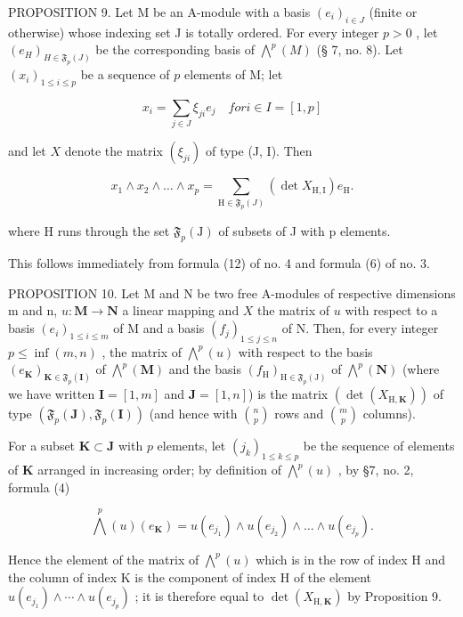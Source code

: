 PROPOSITION 9. Let M be an A-module with a basis \((e_i)_{i \in J}\) (finite or otherwise) whose indexing set J is totally ordered. For every integer \(p > 0\) , let \((e_H)_{H \in \mathfrak{F}_p(J)}\) be the corresponding basis of \(\bigwedge^p(M)\) (§ 7, no. 8). Let \((x_i)_{1 \leqslant i \leqslant p}\) be a sequence of \(p\) elements of M; let

\[
x _ {i} = \sum_ {j \in J} \xi_ {j i} e _ {j} \quad for i \in I = [1, p]
\]

and let \(X\) denote the matrix \((\xi_{ji})\) of type (J, I). Then

\[
x _ {1} \wedge x _ {2} \wedge \dots \wedge x _ {p} = \sum_ {\mathrm{H} \in \mathfrak {F} _ {p} (J)} (\det X _ {\mathrm{H,I}}) e _ {\mathrm{H}}.\tag{17}
\]

where H runs through the set \(\mathfrak{F}_{p}(\mathrm{J})\) of subsets of J with p elements.

This follows immediately from formula (12) of no. 4 and formula (6) of no. 3.

PROPOSITION 10. Let M and N be two free A-modules of respective dimensions m and n, \(u: \mathbf{M} \to \mathbf{N}\) a linear mapping and \(X\) the matrix of \(u\) with respect to a basis \((e_i)_{1 \leqslant i \leqslant m}\) of M and a basis \((f_j)_{1 \leqslant j \leqslant n}\) of N. Then, for every integer \(p \leqslant \inf(m, n)\) , the matrix of \(\bigwedge^p(u)\) with respect to the basis \((e_{\mathbf{K}})_{\mathbf{K} \in \mathfrak{F}_p(\mathbf{I})}\) of \(\bigwedge^p(\mathbf{M})\) and the basis \((f_{\mathrm{H}})_{\mathrm{H} \in \mathfrak{F}_p(\mathrm{J})}\) of \(\bigwedge^p(\mathbf{N})\) (where we have written \(\mathbf{I} = [1, m]\) and \(\mathbf{J} = [1, n]\)) is the matrix \((\det(X_{\mathrm{H},\mathbf{K}}))\) of type \((\mathfrak{F}_p(\mathbf{J}), \mathfrak{F}_p(\mathbf{I}))\) (and hence with \(\binom{n}{p}\) rows and \(\binom{m}{p}\) columns).

For a subset \(\mathbf{K} \subset \mathbf{J}\) with \(p\) elements, let \((j_k)_{1 \leqslant k \leqslant p}\) be the sequence of elements of \(\mathbf{K}\) arranged in increasing order; by definition of \(\bigwedge^p(u)\) , by §7, no. 2, formula (4)

\[
\bigwedge^ {p} (u) \left(e _ {\mathbf {K}}\right) = u \left(e _ {j _ {1}}\right) \wedge u \left(e _ {j _ {2}}\right) \wedge \dots \wedge u \left(e _ {j _ {p}}\right).
\]

Hence the element of the matrix of \(\bigwedge^{p}(u)\) which is in the row of index H and the column of index K is the component of index H of the element \(u(e_{j_1}) \wedge \cdots \wedge u(e_{j_p})\) ; it is therefore equal to \(\det(X_{\mathrm{H},\mathbf{K}})\) by Proposition 9.

